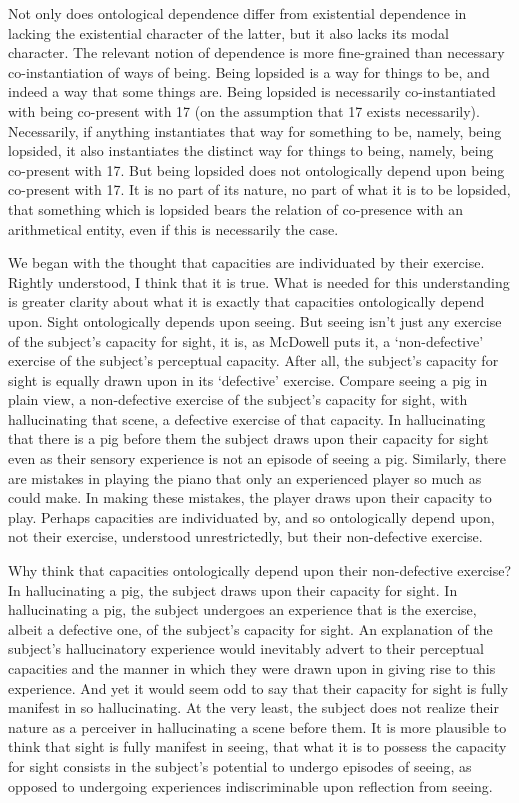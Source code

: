 \documentclass[12pt]{article}
\begin{document}
Not only does ontological dependence differ from existential dependence in lacking the existential character of the latter, but it also lacks its modal character. The relevant notion of dependence is more fine-grained than necessary co-instantiation of ways of being. Being lopsided is a way for things to be, and indeed a way that some things are. Being lopsided is necessarily co-instantiated with being co-present with 17 (on the assumption that 17 exists necessarily). Necessarily, if anything instantiates that way for something to be, namely, being lopsided, it also instantiates the distinct way for things to being, namely, being co-present with 17. But being lopsided does not ontologically depend upon being co-present with 17. It is no part of its nature, no part of what it is to be lopsided, that something which is lopsided bears the relation of co-presence with an arithmetical entity, even if this is necessarily the case.

We began with the thought that capacities are individuated by their exercise. Rightly understood, I think that it is true. What is needed for this understanding is greater clarity about what it is exactly that capacities ontologically depend upon. Sight ontologically depends upon seeing. But seeing isn't just any exercise of the subject's capacity for sight, it is, as McDowell puts it, a `non-defective' exercise of the subject's perceptual capacity. After all, the subject's capacity for sight is equally drawn upon in its `defective' exercise. Compare seeing a pig in plain view, a non-defective exercise of the subject's capacity for sight, with hallucinating that scene, a defective exercise of that capacity. In hallucinating that there is a pig before them the subject draws upon their capacity for sight even as their sensory experience is not an episode of seeing a pig. Similarly, there are mistakes in playing the piano that only an experienced player so much as could make. In making these mistakes, the player draws upon their capacity to play. Perhaps capacities are individuated by, and so ontologically depend upon, not their exercise, understood unrestrictedly, but their non-defective exercise.

Why think that capacities ontologically depend upon their non-defective exercise? In hallucinating a pig, the subject draws upon their capacity for sight. In hallucinating a pig, the subject undergoes an experience that is the exercise, albeit a defective one, of the subject's capacity for sight. An explanation of the subject's hallucinatory experience would inevitably advert to their perceptual capacities and the manner in which they were drawn upon in giving rise to this experience. And yet it would seem odd to say that their capacity for sight is fully manifest in so hallucinating. At the very least, the subject does not realize their nature as a perceiver in hallucinating a scene before them. It is more plausible to think that sight is fully manifest in seeing, that what it is to possess the capacity for sight consists in the subject's potential to undergo episodes of seeing, as opposed to undergoing experiences indiscriminable upon reflection from seeing.
\end{document}
